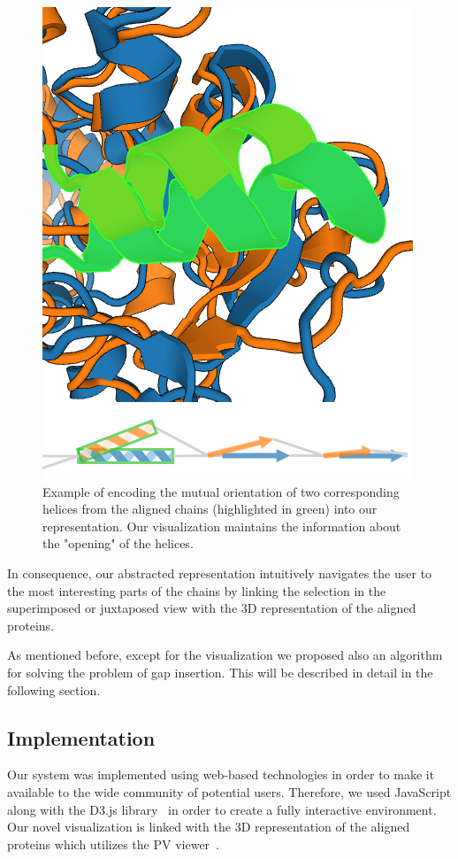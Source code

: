 \documentclass[twocolumn]{bmcart}%
\begin{document}
\begin{figure}[ht]
  \centering
  \includegraphics[width=0.9\linewidth]{pics/orientation.png}
  \caption{Example of encoding the mutual orientation of two corresponding helices from the aligned chains (highlighted in green) into our representation. Our visualization maintains the information about the "opening" of the helices.}
  \label{fig:orientation}
\end{figure}

In consequence, our abstracted representation intuitively navigates the user to the most interesting parts of the chains by linking the selection in the superimposed or juxtaposed view with the 3D representation of the aligned proteins. 

As mentioned before, except for the visualization we proposed also an algorithm for solving the problem of gap insertion.
This will be described in detail in the following section.


\subsection*{Implementation}
Our system was implemented using web-based technologies in order to make it available to the wide community of potential users.
Therefore, we used JavaScript along with the D3.js library~\cite{d3} in order to create a fully interactive environment.
Our novel visualization is linked with the 3D representation of the aligned proteins which utilizes the PV viewer~\cite{biasini2014}. 
\end{document}
